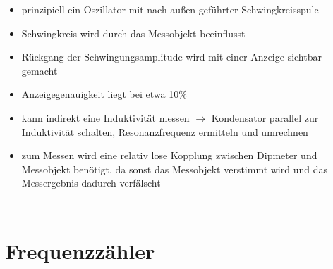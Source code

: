\begin{frame}
\begin{columns}
\begin{itemize}
      \item prinzipiell ein Oszillator mit nach außen geführter Schwingkreisspule
      \item Schwingkreis wird durch das Messobjekt beeinflusst
      \item Rückgang der Schwingungsamplitude wird mit einer Anzeige sichtbar gemacht
      \item Anzeigegenauigkeit liegt bei etwa 10\%
      \item kann indirekt eine Induktivität messen $\rightarrow$ Kondensator parallel zur Induktivität schalten, Resonanzfrequenz ermitteln und umrechnen
      \item zum Messen wird eine relativ lose Kopplung zwischen Dipmeter und Messobjekt benötigt, da sonst das Messobjekt verstimmt wird und das Messergebnis dadurch verfälscht
    \end{itemize}
  \end{columns}
\end{frame}

\section*{Frequenzzähler}

